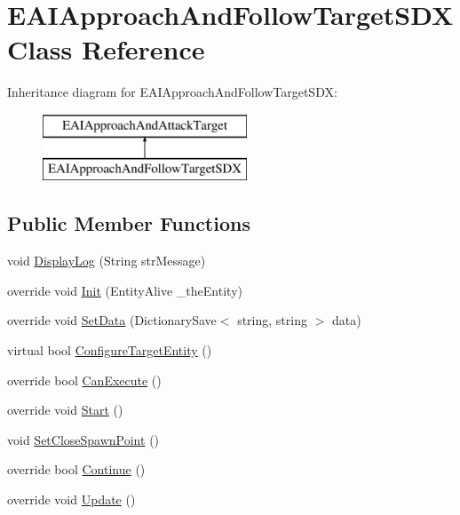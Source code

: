 \hypertarget{class_e_a_i_approach_and_follow_target_s_d_x}{}\section{E\+A\+I\+Approach\+And\+Follow\+Target\+S\+DX Class Reference}
\label{class_e_a_i_approach_and_follow_target_s_d_x}
Inheritance diagram for E\+A\+I\+Approach\+And\+Follow\+Target\+S\+DX\+:\begin{figure}[H]
\begin{center}
\leavevmode
\includegraphics[height=2.000000cm]{d8/d59/class_e_a_i_approach_and_follow_target_s_d_x}
\end{center}
\end{figure}
\subsection*{Public Member Functions}
\begin{DoxyCompactItemize}
\item 
void \mbox{\hyperlink{class_e_a_i_approach_and_follow_target_s_d_x_a56cb2c3da73cdb629a9354d2f3be8d06}{Display\+Log}} (String str\+Message)
\item 
override void \mbox{\hyperlink{class_e_a_i_approach_and_follow_target_s_d_x_ac2b966082c483ea7660520dddda21941}{Init}} (Entity\+Alive \+\_\+the\+Entity)
\item 
override void \mbox{\hyperlink{class_e_a_i_approach_and_follow_target_s_d_x_aee3cd22a7477f5f298c3a8d61adeacc6}{Set\+Data}} (Dictionary\+Save$<$ string, string $>$ data)
\item 
virtual bool \mbox{\hyperlink{class_e_a_i_approach_and_follow_target_s_d_x_ac0dde8a72e020fd849a86495b47c707d}{Configure\+Target\+Entity}} ()
\item 
override bool \mbox{\hyperlink{class_e_a_i_approach_and_follow_target_s_d_x_a4bd593810e37cd0adef6eef1575f44a9}{Can\+Execute}} ()
\item 
override void \mbox{\hyperlink{class_e_a_i_approach_and_follow_target_s_d_x_a5c8261a707932d140f698af8af1cb5f4}{Start}} ()
\item 
void \mbox{\hyperlink{class_e_a_i_approach_and_follow_target_s_d_x_a90ef1e3a5ebc7dfef60e74db82cdaf28}{Set\+Close\+Spawn\+Point}} ()
\item 
override bool \mbox{\hyperlink{class_e_a_i_approach_and_follow_target_s_d_x_aa6c1b4815975ccb63e7af74710fa4936}{Continue}} ()
\item 
override void \mbox{\hyperlink{class_e_a_i_approach_and_follow_target_s_d_x_af6a82c01d51c142df19ce0ae9f24d722}{Update}} ()
\end{DoxyCompactItemize}


